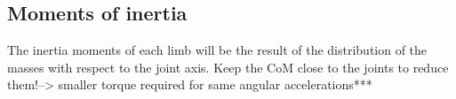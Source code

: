 \subsection{Moments of inertia} %
\label{par:moments_of_inertia}
The inertia moments of each limb will be the result of the distribution of the masses with respect to the joint axis.
Keep the CoM close to the joints to reduce them!--> smaller torque required for same angular accelerations***






